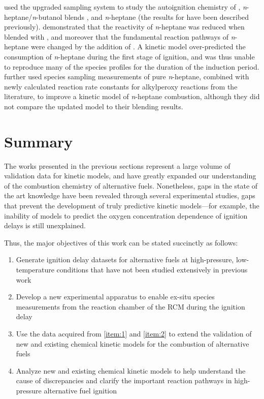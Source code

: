 \documentclass[../main.tex]{subfiles}
\begin{document}
\textcite{Karwat2011a, Karwat2012, Karwat2013} used the upgraded
sampling system to study the autoignition chemistry of \nBuOH{}
\cite{Karwat2011a}, \textit{n}-heptane/\textit{n}-butanol blends
\cite{Karwat2012}, and \textit{n}-heptane \cite{Karwat2013} (the results
for \nBuOH{} have been described previously). \textcite{Karwat2012}
demonstrated that the reactivity of \textit{n}-heptane was reduced when
blended with \nBuOH{}, and moreover that the fundamental reaction
pathways of \textit{n}-heptane were changed by the addition of \nBuOH{}.
A kinetic model over-predicted the consumption of \textit{n}-heptane
during the first stage of ignition, and was thus unable to reproduce many
of the species profiles for the duration of the induction period.
\textcite{Karwat2013} further used species sampling measurements of pure
\textit{n}-heptane, combined with newly calculated reaction rate constants
for alkylperoxy reactions from the literature, to improve a kinetic
model of \textit{n}-heptane combustion, although they did not compare the
updated model to their blending results.

\section{Summary}

The works presented in the previous sections represent a large volume
of validation data for kinetic models, and have greatly expanded our
understanding of the combustion chemistry of alternative fuels.
Nonetheless, gaps in the state of the art knowledge have been revealed
through several experimental studies, gaps that prevent the development
of truly predictive kinetic models---for example, the inability of
models to predict the oxygen concentration dependence of ignition delays
is still unexplained.

Thus, the major objectives of this work can be stated succinctly as
follows:

\begin{enumerate}
\item \label{item:1} Generate ignition delay datasets for alternative
fuels at high-pressure, low-temperature conditions that have not been
studied extensively in previous work

\item \label{item:2} Develop a new experimental apparatus to enable
ex-situ species measurements from the reaction chamber of the RCM during
the ignition delay

\item Use the data acquired from \cref{item:1} and \cref{item:2}
to extend the validation of new and existing chemical kinetic models
for the combustion of alternative fuels

\item Analyze new and existing chemical kinetic models to help
understand the cause of discrepancies and clarify the important
reaction pathways in high-pressure alternative fuel ignition
\end{enumerate}
\end{document}
